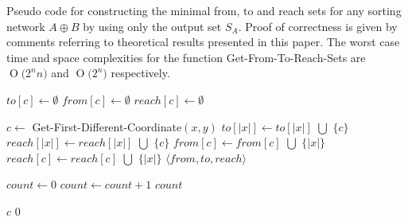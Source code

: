 \documentclass[13pt,a4paper]{article}
\newcommand{\BigO}[1]{\ensuremath{\operatorname{O}\bigl(#1\bigr)}}
\begin{document}
\clearpage
\begin{algorithm} [H]
\caption{Pseudo code for constructing the minimal from, to and reach sets for any sorting network $A \oplus B$ by using only the output set $S_A$. Proof of correctness is given by comments referring to theoretical results presented in this paper. The worst case time and space complexities for the function Get-From-To-Reach-Sets are $\BigO{2^n n}$ and $\BigO{2^n}$ respectively.}
\label{algo:construct_reach}
\begin{algorithmic} [1]
\State $to[c] \leftarrow \emptyset$
\State $from[c] \leftarrow \emptyset$
\State $reach[c] \leftarrow \emptyset$
\EndFor

		\State $c \longleftarrow$ Get-First-Different-Coordinate$(x, y)$
		\State $to[ |x| ] \longleftarrow to[ |x| ]$ $\bigcup$ $\{ c \}$
		\State $reach[ |x| ] \longleftarrow reach[ |x| ]$ $\bigcup$ $\{ c \}$
		\State $from[ c ] \longleftarrow from[ c ]$ $\bigcup$ $\{ |x| \}$
		\State $reach[ c ] \longleftarrow reach[ c ]$ $\bigcup$ $\{ |x| \}$
	\EndIf
\EndFor
\State \Return $\langle from, to, reach \rangle$
\EndFunction

\State

\State $count \longleftarrow 0$
		\State $count \longleftarrow count + 1$
	\EndIf
\EndFor
\State \Return $count$
\EndFunction

\State

		\State \Return $c$
	\EndIf
\EndFor
\State \Return $0$
\EndFunction

\end{algorithmic}
\end{algorithm}
\end{document}

